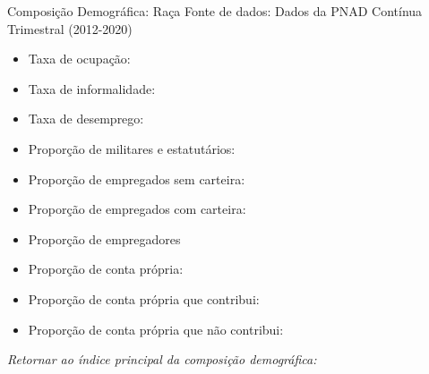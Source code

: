 \begin{frame}[label=_composicao_demografica_raca]{Composição Demográfica: Raça}
{\footnotesize Fonte de dados: Dados da PNAD Contínua Trimestral (2012-2020)}
\begin{itemize}
\item{Taxa de ocupação: \hyperlink{_composicao_demografica_raca_taxa_de_ocupacao}{}}
\item{Taxa de informalidade: \hyperlink{_composicao_demografica_raca_taxa_de_informalidade}{}}
\item{Taxa de desemprego: \hyperlink{_composicao_demografica_raca_taxa_de_desemprego}{}}
\item{Proporção de militares e estatutários: \hyperlink{_composicao_demografica_raca_prop_militar}{}}
\item{Proporção de empregados sem carteira: \hyperlink{_composicao_demografica_raca_prop_empregadoSC}{}}
\item{Proporção de empregados com carteira: \hyperlink{_composicao_demografica_raca_prop_empregadoCC}{}}
\item{Proporção de empregadores \hyperlink{_composicao_demografica_raca_prop_empregador}{}}
\item{Proporção de conta própria: \hyperlink{_composicao_demografica_raca_prop_cpropria}{}}
\item{Proporção de conta própria que contribui: \hyperlink{_composicao_demografica_raca_prop_cpropriaC}{}}
\item{Proporção de conta própria que não contribui: \hyperlink{_composicao_demografica_raca_prop_cpropriaNc}{}}
\end{itemize}

\begin{small}
\textit{Retornar ao índice principal da composição demográfica: \hyperlink{_composicao_demografica}{} }
\end{small}

\end{frame}

